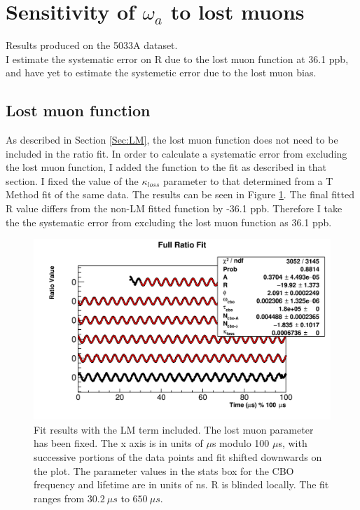 \section{Sensitivity of \texorpdfstring{$\omega_{a}$}{} to lost muons}
\label{Sec:SystematicLM}

	Results produced on the 5033A dataset. \\

	I estimate the systematic error on R due to the lost muon function at 36.1 ppb, and have yet to estimate the systemetic error due to the lost muon bias.

	\subsection{Lost muon function}
	\label{SubSec:LMFunc}

		As described in Section \ref{Sec:LM}, the lost muon function does not need to be included in the ratio fit. In order to calculate a systematic error from excluding the lost muon function, I added the function to the fit as described in that section. I fixed the value of the $\kappa_{loss}$ parameter to that determined from a T Method fit of the same data. The results can be seen in Figure \ref{fig:LMModuloPlot}. The final fitted R value differs from the non-LM fitted function by -36.1 ppb. Therefore I take the the systematic error from excluding the lost muon function as 36.1 ppb. 

		\begin{figure}[]
			\centering
			\includegraphics[width=\textwidth]{ratioCBO_moduloPlot-lostmuonsfixed}
		    \caption[LMModuloPlot]{Fit results with the LM term included. The lost muon parameter has been fixed. The x axis is in units of $\mu$s modulo 100 $\mu$s, with successive portions of the data points and fit shifted downwards on the plot. The parameter values in the stats box for the CBO frequency and lifetime are in units of ns. R is blinded locally. The fit ranges from $\SI{30.2}{\mu s}$ to $\SI{650}{\mu s}$.}
		    \label{fig:LMModuloPlot}
		\end{figure}


